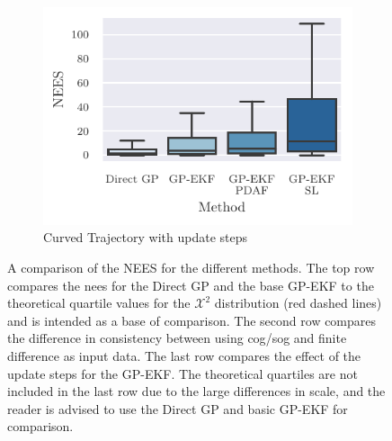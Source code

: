 \begin{figure}
{\begin{subfigure}{0.6\textwidth}
            \includegraphics{figures/curved_line_stats/nees.pdf}
            \caption{Curved Trajectory with update steps}
            \label{fig:stats_curved_nees_update}
        \end{subfigure}
    }

    \caption{A comparison of the NEES for the different methods. The top row compares the \acrshort{nees} for the Direct GP and the base GP-EKF to the theoretical quartile values for the $\mathcal{X}^2$ distribution (red dashed lines) and is intended as a base of comparison. The second row compares the difference in consistency between using \acrshort{cog}/\acrshort{sog} and finite difference as input data. The last row compares the effect of the update steps for the GP-EKF. The theoretical quartiles are not included in the last row due to the large differences in scale, and the reader is advised to use the Direct GP and basic GP-EKF for comparison.}

\end{figure}






